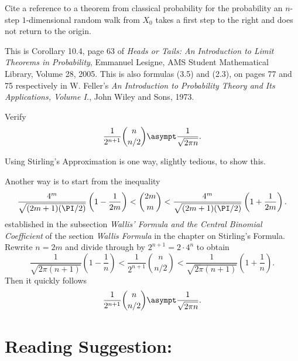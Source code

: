 \documentclass[12pt]{article}
\begin{document}
\begin{exercise}
    Cite a reference to a theorem from classical probability for the
    probability an \( n \)-step \( 1 \)-dimensional random walk from \(
    X_0 \) takes a first step to the right and does not return to the
    origin.
\end{exercise}
\begin{solution}
    This is Corollary 10.4, page 63 of \textit{Heads or Tails:  An
    Introduction to Limit Theorems in Probability}, Emmanuel Lesigne,
    AMS Student Mathematical Library, Volume 28, 2005.  This is also
    formulas (3.5) and (2.3), on pages 77 and 75 respectively in W.
    Feller's \textit{An Introduction to Probability Theory and Its
    Applications, Volume I.}, John Wiley and Sons, 1973.
\end{solution}

\begin{exercise}
    Verify
    \[
        \frac{1}{2^{n+1}}\binom{n}{n/2} \asympt \frac{1}{\sqrt{2 \pi n}}.
    \]
\end{exercise}
\begin{solution}
    Using Stirling's Approximation is one way, slightly tedious, to show
    this.

    Another way is to start from the inequality
    \[
        \frac{4^m}{\sqrt{(2m+1)(\PI/2)}}\left(1-\frac{1}{2m} \right) < {\binom
        {2m}{m}} < \frac{4^m}{\sqrt{(2m+1)(\PI/2)}} \left(1 + \frac{1}{2m}
        \right).
    \] established in the subsection \emph{Wallis' Formula and the
    Central Binomial Coefficient} of the section \emph{Wallis Formula}
    in the chapter on Stirling's Formula.  Rewrite \( n = 2m \) and
    divide through by \( 2^{n + 1} = 2 \cdot 4^n \) to obtain
    \[
        \frac{1}{\sqrt{2\pi(n+1)}} \left( 1 - \frac{1}{n} \right) <
        \frac{1}{2^{n+1}} \binom{n}{n/2} < \frac{1}{\sqrt{2\pi(n+1)}}
        \left( 1 + \frac{1}{n} \right).
    \] Then it quickly follows
    \[
        \frac{1}{2^{n+1}}\binom{n}{n/2} \asympt \frac{1}{\sqrt{2 \pi n}}.
    \]
\end{solution}

\hr

\section*{Reading Suggestion:}


\end{document}
